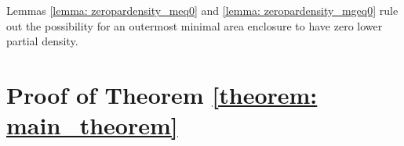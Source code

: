 \documentclass{amsart}
\newcommand{\hm}{\mathscr{H}}
\newcommand{\ts}{\tilde{\Sigma}}
\theoremstyle{named}
\begin{document}

Lemmas \ref{lemma: zeropardensity_meq0} and \ref{lemma: zeropardensity_mgeq0} rule out the possibility for an outermost minimal area enclosure to have zero lower partial density.


\section{Proof of Theorem \ref{theorem: main_theorem}} \label{section: main_theorem}

\end{document}
